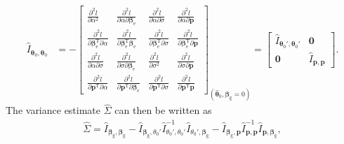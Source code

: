 \documentclass[10pt,a4paper]{article}
\def\bbetag{\bm{\beta}_{\text{g}}}
\def\bbetae{\bm{\beta}_{\text{e}}}
\begin{document}
\begin{align*}
\hat{I}_{\boldsymbol\theta_0, \boldsymbol\theta_0} & = -
\begin{bmatrix}
\frac{\partial^2 l}{\partial \alpha^2}  & \frac{\partial^2 l}{\partial \alpha \partial \bbetae} & \frac{\partial^2 l}{\partial \alpha \partial \sigma} & \frac{\partial^2 l}{\partial \alpha \partial \mathbf{p}} \\
\frac{\partial^2 l}{\partial \bbetae^{\text{T}} \partial \alpha} & \frac{\partial^2 l}{\partial \bbetae^{\text{T}} \bbetae} & \frac{\partial^2 l}{\partial \bbetae^{\text{T}} \partial \sigma} & \frac{\partial^2 l}{\partial \bbetae^{\text{T}} \partial \mathbf{p}}\\
\frac{\partial^2 l}{\partial \alpha \partial \sigma} & \frac{\partial^2 l}{\partial \sigma \partial \bbetae} & \frac{\partial^2 l}{\partial \sigma^2}& \frac{\partial^2 l}{\partial \sigma \partial \mathbf{p}} \\
\frac{\partial^2 l}{\partial \mathbf{p}^{\text{T}} \partial \alpha } & \frac{\partial^2 l}{ \partial \mathbf{p}^{\text{T}} \partial \bbetae} & \frac{\partial^2 l}{ \partial \mathbf{p}^{\text{T}} \partial \sigma} & \frac{\partial^2 l}{\partial \mathbf{p}^{\text{T}} \mathbf{p}}
\end{bmatrix}_{(\hat{\boldsymbol\theta}_0, \bbetag= 0)}
= \begin{bmatrix}
\hat{I}_{\boldsymbol\theta_0', \boldsymbol\theta_0'} & \mathbf{0} \\
\mathbf{0} & \hat{I}_{\mathbf{p}, \mathbf{p}}
\end{bmatrix}.
\end{align*}
The variance estimate $\hat{\Sigma}$ can then be written as
\begin{align*}
\hat{\Sigma} = \hat{I}_{\bbetag, \bbetag} - \hat{I}_{\bbetag, \theta_0'} \hat{I}_{\theta_0', \theta_0'}^{-1} \hat{I}_{\theta_0',\bbetag} - \hat{I}_{\bbetag,\mathbf{p}} \hat{I}_{\mathbf{p}, \mathbf{p}}^{-1} \hat{I}_{\mathbf{p},\bbetag},
\end{align*}
\end{document}
